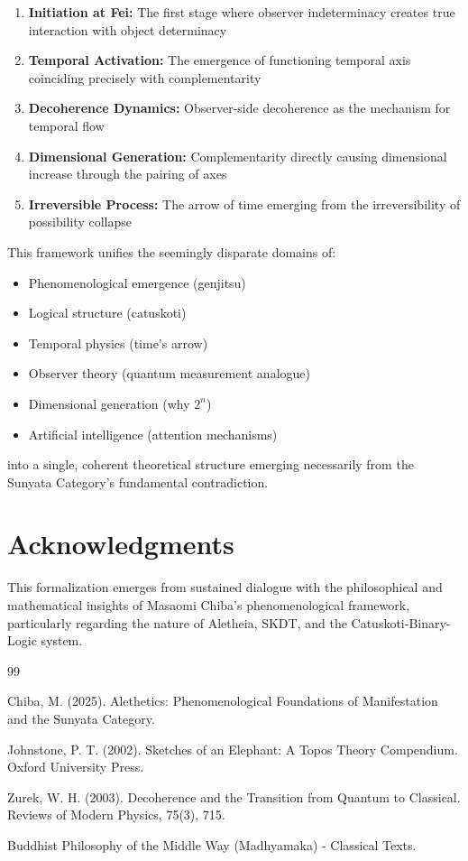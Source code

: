 \documentclass[12pt,a4paper]{article}
\begin{document}
\begin{enumerate}
    \item \textbf{Initiation at Fei:} The first stage where observer indeterminacy creates true interaction with object determinacy
    
    \item \textbf{Temporal Activation:} The emergence of functioning temporal axis coinciding precisely with complementarity
    
    \item \textbf{Decoherence Dynamics:} Observer-side decoherence as the mechanism for temporal flow
    
    \item \textbf{Dimensional Generation:} Complementarity directly causing dimensional increase through the pairing of axes
    
    \item \textbf{Irreversible Process:} The arrow of time emerging from the irreversibility of possibility collapse
\end{enumerate}

This framework unifies the seemingly disparate domains of:
\begin{itemize}
    \item Phenomenological emergence (genjitsu)
    \item Logical structure (catuskoti)
    \item Temporal physics (time's arrow)
    \item Observer theory (quantum measurement analogue)
    \item Dimensional generation (why $2^n$)
    \item Artificial intelligence (attention mechanisms)
\end{itemize}

into a single, coherent theoretical structure emerging necessarily from the Sunyata Category's fundamental contradiction.

\section*{Acknowledgments}

This formalization emerges from sustained dialogue with the philosophical and mathematical insights of Masaomi Chiba's phenomenological framework, particularly regarding the nature of Aletheia, SKDT, and the Catuskoti-Binary-Logic system.

\begin{thebibliography}{99}

 Chiba, M. (2025). Alethetics: Phenomenological Foundations of Manifestation and the Sunyata Category.

 Johnstone, P. T. (2002). Sketches of an Elephant: A Topos Theory Compendium. Oxford University Press.

 Zurek, W. H. (2003). Decoherence and the Transition from Quantum to Classical. Reviews of Modern Physics, 75(3), 715.

 Buddhist Philosophy of the Middle Way (Madhyamaka) - Classical Texts.

\end{thebibliography}
\end{document}
